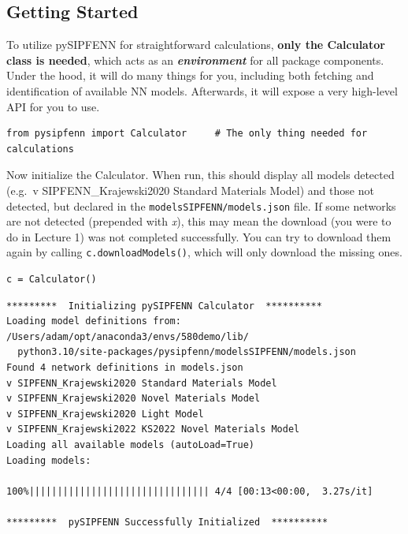 \hypertarget{getting-started}{%
\subsection{Getting Started}\label{pysipfenntutorial2:getting-started}}

To utilize pySIPFENN for straightforward calculations, \textbf{only the
Calculator class is needed}, which acts as an
\textbf{\emph{environment}} for all package components. Under the hood,
it will do many things for you, including both fetching and
identification of available NN models. Afterwards, it will expose a very
high-level API for you to use.

\begin{verbatim}
from pysipfenn import Calculator     # The only thing needed for calculations
\end{verbatim}

Now initialize the Calculator. When run, this should display all models
detected (e.g.~v SIPFENN\_Krajewski2020 Standard Materials Model) and
those not detected, but declared in the
\texttt{modelsSIPFENN/models.json} file. If some
networks are not detected (prepended with \emph{x}), this may mean the
download (you were to do in Lecture 1) was not completed successfully.
You can try to download them again by calling
\texttt{c.downloadModels()}, which will only download
the missing ones.

\begin{verbatim}
c = Calculator()
\end{verbatim}

\begin{verbatim}
*********  Initializing pySIPFENN Calculator  **********
Loading model definitions from: /Users/adam/opt/anaconda3/envs/580demo/lib/
  python3.10/site-packages/pysipfenn/modelsSIPFENN/models.json
Found 4 network definitions in models.json
v SIPFENN_Krajewski2020 Standard Materials Model
v SIPFENN_Krajewski2020 Novel Materials Model
v SIPFENN_Krajewski2020 Light Model
v SIPFENN_Krajewski2022 KS2022 Novel Materials Model
Loading all available models (autoLoad=True)
Loading models:

100%|||||||||||||||||||||||||||||||| 4/4 [00:13<00:00,  3.27s/it]

*********  pySIPFENN Successfully Initialized  **********
\end{verbatim}


